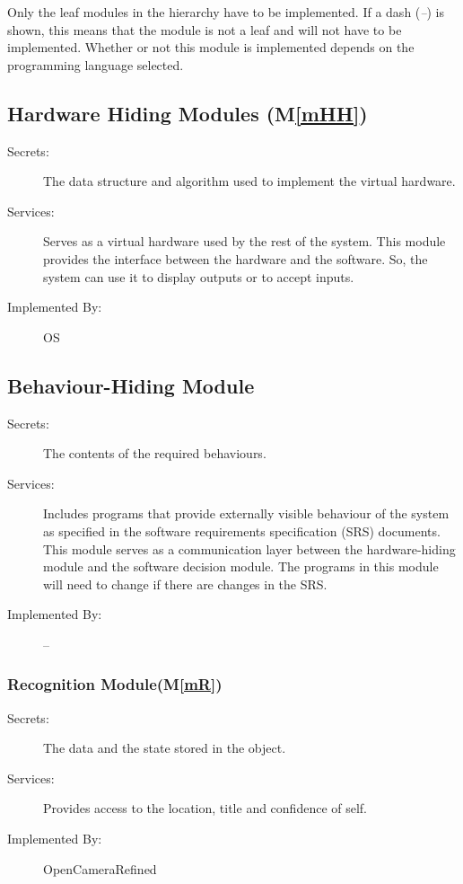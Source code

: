 \documentclass[12pt, titlepage]{article}
\newcommand{\mref}[1]{M\ref{#1}}
\begin{document}
Only the leaf modules in the
hierarchy have to be implemented. If a dash (\emph{--}) is shown, this means
that the module is not a leaf and will not have to be implemented. Whether or
not this module is implemented depends on the programming language
selected.

\subsection{Hardware Hiding Modules (\mref{mHH})}

\begin{description}
\item[Secrets:]The data structure and algorithm used to implement the virtual
  hardware.
\item[Services:]Serves as a virtual hardware used by the rest of the
  system. This module provides the interface between the hardware and the
  software. So, the system can use it to display outputs or to accept inputs.
\item[Implemented By:] OS
\end{description}

\subsection{Behaviour-Hiding Module}

\begin{description}
\item[Secrets:]The contents of the required behaviours.
\item[Services:]Includes programs that provide externally visible behaviour of
  the system as specified in the software requirements specification (SRS)
  documents. This module serves as a communication layer between the
  hardware-hiding module and the software decision module. The programs in this
  module will need to change if there are changes in the SRS.
\item[Implemented By:] --
\end{description}

\subsubsection{Recognition Module(\mref{mR})}

\begin{description}
\item[Secrets:]The data and the state stored in the object.
\item[Services:]Provides access to the location, title and confidence of self.
\item[Implemented By:] OpenCameraRefined
\end{description}
\end{document}
